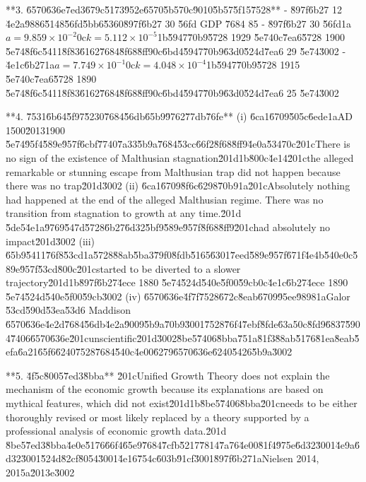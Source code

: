 \documentclass[10pt]{article}
\begin{document}
\begin{AnswerText}
**3. \u6570\u636e\u7ed3\u679c\u5173\u952e\u6570\u5b57\uff0c\u9010\u5b57\u5f15\u7528**
- \u897f\u6b27 12 \u4e2a\u9886\u5148\u56fd\u5bb6\u5360\u897f\u6b27 30 \u56fd GDP \u7684 85%
- \u897f\u6b27 30 \u56fd\uff1a$a=9.859\times10^{-2}$\uff0c$k=5.112\times10^{-5}$\uff1b\u5947\u70b9\u5728 1929 \u5e74\uff0c\u7ea6\u5728 1900 \u5e74\u8f6c\u5411\u8f83\u6162\u7684\u8f68\u8ff9\uff0c\u6bd4\u5947\u70b9\u63d0\u524d\u7ea6 29 \u5e74\u3002
- \u4e1c\u6b27\uff1a$a=7.749\times10^{-1}$\uff0c$k=4.048\times10^{-4}$\uff1b\u5947\u70b9\u5728 1915 \u5e74\uff0c\u7ea6\u5728 1890 \u5e74\u8f6c\u5411\u8f83\u6162\u7684\u8f68\u8ff9\uff0c\u6bd4\u5947\u70b9\u63d0\u524d\u7ea6 25 \u5e74\u3002

**4. \u7531\u6b64\u5f97\u5230\u7684\u56db\u65b9\u9762\u77db\u76fe**
(i) \u6ca1\u6709\u505c\u6ede\uff1aAD 1500\u20131900 \u5e74\u95f4\u589e\u957f\u6cbf\u7740\u7a33\u5b9a\u7684\u53cc\u66f2\u8f68\u8ff9\u4e0a\u5347\uff0c\u201cThere is no sign of the existence of Malthusian stagnation\u201d\uff1b\u800c\u4e14\u201cthe alleged remarkable or stunning escape from Malthusian trap did not happen because there was no trap\u201d\u3002
(ii) \u6ca1\u6709\u8f6c\u6298\u70b9\uff1a\u201cAbsolutely nothing had happened at the end of the alleged Malthusian regime. There was no transition from stagnation to growth at any time.\u201d \u5de5\u4e1a\u9769\u547d\u5728\u6b27\u6d32\u5bf9\u589e\u957f\u8f68\u8ff9\u201chad absolutely no impact\u201d\u3002
(iii) \u65b9\u5411\u76f8\u53cd\uff1a\u5728\u88ab\u5ba3\u79f0\u8fdb\u5165\u6301\u7eed\u589e\u957f\u671f\u4e4b\u540e\uff0c\u589e\u957f\u53cd\u800c\u201cstarted to be diverted to a slower trajectory\u201d\uff1b\u897f\u6b27\u4ece 1880 \u5e74\u524d\u540e\u5f00\u59cb\uff0c\u4e1c\u6b27\u4ece 1890 \u5e74\u524d\u540e\u5f00\u59cb\u3002
(iv) \u6570\u636e\u4f7f\u7528\u672c\u8eab\u6709\u95ee\u9898\uff1aGalor \u53cd\u590d\u53ea\u53d6 Maddison \u6570\u636e\u4e2d\u7684\u56db\u4e2a\u9009\u5b9a\u70b9\u3001\u7528\u76f4\u7ebf\u8fde\u63a5\uff0c\u8fd9\u6837\u5904\u7406\u6570\u636e\u201cunscientific\u201d\u3002\u8be5\u7406\u8bba\u751a\u81f3\u88ab\u5176\u81ea\u8eab\u5efa\u6a21\u65f6\u6240\u7528\u7684\u540c\u4e00\u6279\u6570\u636e\u6240\u5426\u5b9a\u3002

**5. \u4f5c\u8005\u7ed3\u8bba**
\u201cUnified Growth Theory does not explain the mechanism of the economic growth because its explanations are based on mythical features, which did not exist\u201d\uff1b\u8be5\u7406\u8bba\u201cneeds to be either thoroughly revised or most likely replaced by a theory supported by a professional analysis of economic growth data.\u201d \u8be5\u7ed3\u8bba\u4e0e\u5176\u66f4\u65e9\u7684\u7cfb\u5217\u7814\u7a76\u4e00\u81f4\u975e\u6d32\u3001\u4e9a\u6d32\u3001\u524d\u82cf\u8054\u3001\u4e16\u754c\u603b\u91cf\u3001\u897f\u6b27\uff1aNielsen 2014, 2015a\u2013e\u3002


\end{AnswerText}
\end{document}

